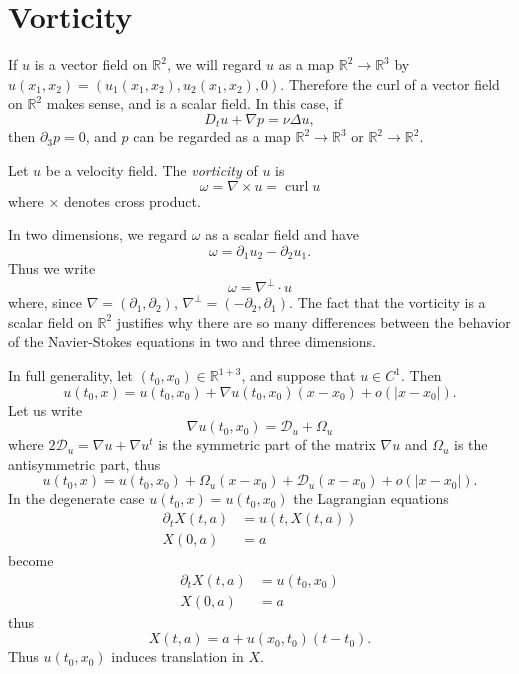 \documentclass[12pt]{book}
\newcommand{\RR}{\mathbb{R}}
\DeclareMathOperator{\curl}{curl}
\newcommand{\dfn}[1]{\emph{#1}\index{#1}}
\theoremstyle{definition}
\newenvironment{definition}
  {\pushQED{\qed}\renewcommand{\qedsymbol}{$\diamondsuit$}\definitionx}
  {\popQED\endexamplex}
\begin{document}
\section{Vorticity}
If $u$ is a vector field on $\RR^2$, we will regard $u$ as a map $\RR^2 \to \RR^3$ by $u(x_1, x_2) = (u_1(x_1, x_2), u_2(x_1, x_2), 0)$.
Therefore the curl of a vector field on $\RR^2$ makes sense, and is a scalar field.
In this case, if
$$D_tu + \nabla p = \nu \Delta u,$$
then $\partial_3p = 0$, and $p$ can be regarded as a map $\RR^2 \to \RR^3$ or $\RR^2 \to \RR^2$.

\begin{definition}
Let $u$ be a velocity field. The \dfn{vorticity} of $u$ is
$$\omega = \nabla \times u = \curl u$$
where $\times$ denotes cross product.
\end{definition}

In two dimensions, we regard $\omega$ as a scalar field and have
$$\omega = \partial_1 u_2 - \partial_2 u_1.$$
Thus we write
$$\omega = \nabla^\perp \cdot u$$
where, since $\nabla = (\partial_1, \partial_2)$, $\nabla^\perp = (-\partial_2, \partial_1)$.
The fact that the vorticity is a scalar field on $\RR^2$ justifies why there are so many differences between the behavior of the Navier-Stokes equations in two and three dimensions.

In full generality, let $(t_0, x_0) \in \RR^{1 + 3}$, and suppose that $u \in C^1$. Then
$$u(t_0, x) = u(t_0, x_0) + \nabla u(t_0, x_0) (x - x_0) + o(|x - x_0|).$$
Let us write
$$\nabla u(t_0, x_0) = \mathscr D_u + \Omega_u$$
where $2\mathscr D_u = \nabla u + \nabla u^t$ is the symmetric part of the matrix $\nabla u$ and $\Omega_u$ is the antisymmetric part, thus
$$u(t_0, x) = u(t_0, x_0) + \Omega_u(x - x_0) + \mathscr D_u(x - x_0) + o(|x - x_0|).$$
In the degenerate case $u(t_0, x) = u(t_0, x_0)$ the Lagrangian equations
\begin{align*}
\partial_t X(t, a) &= u(t, X(t, a))\\
X(0, a) &= a
\end{align*}
become
\begin{align*}
\partial_t X(t, a) &= u(t_0, x_0)\\
X(0, a) &= a
\end{align*}
thus
$$X(t, a) = a + u(x_0, t_0)(t - t_0).$$
Thus $u(t_0, x_0)$ induces translation in $X$.
\end{document}
